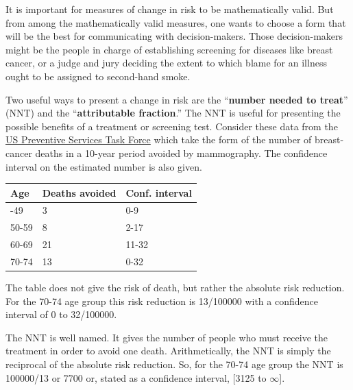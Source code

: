 \documentclass[
  letterpaper,
  DIV=11,
  numbers=noendperiod,
  oneside]{scrartcl}
\begin{document}
\begin{tcolorbox}[enhanced jigsaw, colbacktitle=quarto-callout-note-color!10!white, opacityback=0, breakable, opacitybacktitle=0.6, colback=white, coltitle=black, arc=.35mm, title=\textcolor{quarto-callout-note-color}{\faInfo}\hspace{0.5em}{Other ways to measure change in risk}, left=2mm, colframe=quarto-callout-note-color-frame, rightrule=.15mm, bottomrule=.15mm, leftrule=.75mm, bottomtitle=1mm, toptitle=1mm, titlerule=0mm, toprule=.15mm]

It is important for measures of change in risk to be mathematically
valid. But from among the mathematically valid measures, one wants to
choose a form that will be the best for communicating with
decision-makers. Those decision-makers might be the people in charge of
establishing screening for diseases like breast cancer, or a judge and
jury deciding the extent to which blame for an illness ought to be
assigned to second-hand smoke.

Two useful ways to present a change in risk are the ``\textbf{number
needed to treat}'' (NNT) and the ``\textbf{attributable fraction}.'' The
NNT is useful for presenting the possible benefits of a treatment or
screening test. Consider these data from the
\href{https://www.uspreventiveservicestaskforce.org/uspstf/document/RecommendationStatementFinal/breast-cancer-screening}{US
Preventive Services Task Force} which take the form of the number of
breast-cancer deaths in a 10-year period avoided by mammography. The
confidence interval on the estimated number is also given.

\begin{longtable}[]{@{}lll@{}}
\toprule\noalign{}
Age & Deaths avoided & Conf. interval \\
\midrule\noalign{}
\endhead
\bottomrule\noalign{}
\endlastfoot
40-49 & 3 & 0-9 \\
50-59 & 8 & 2-17 \\
60-69 & 21 & 11-32 \\
70-74 & 13 & 0-32 \\
\end{longtable}

The table does not give the risk of death, but rather the absolute risk
reduction. For the 70-74 age group this risk reduction is 13/100000 with
a confidence interval of 0 to 32/100000.

The NNT is well named. It gives the number of people who must receive
the treatment in order to avoid one death. Arithmetically, the NNT is
simply the reciprocal of the absolute risk reduction. So, for the 70-74
age group the NNT is 100000/13 or 7700 or, stated as a confidence
interval, {[}3125 to \(\infty\){]}.


\end{tcolorbox}
\end{document}
